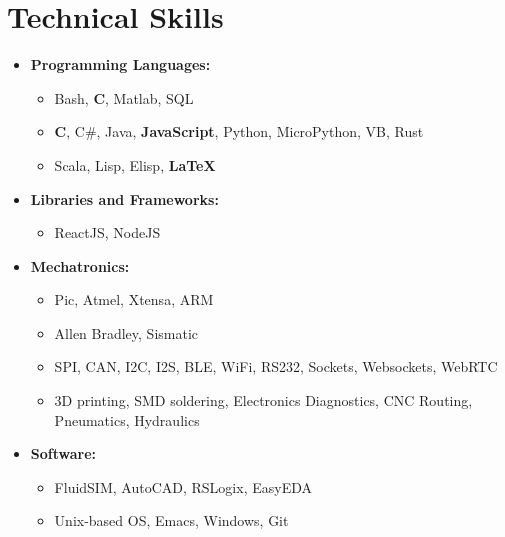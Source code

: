 \documentclass[10pt,letterpaper,sans]{moderncv}
\renewcommand{\_}{\textscale{.7}{\textunderscore}}
\newcommand{\Rplus}{\protect\hspace{-.1em}\protect\raisebox{.35ex}{\smaller{\smaller\textbf{+}}}}
\newcommand{\Cpp}{\mbox{C\Rplus\Rplus}\xspace}
\begin{document}
\section{Technical Skills}
\begin{itemize}
\item \textbf{Programming Languages:}
  \begin{itemize}
    \item {} Bash, \textbf{C}, Matlab, SQL
    \item {} \textbf{\Cpp}, C\#, Java, \textbf{JavaScript}, Python, MicroPython, VB, Rust
    \item {} Scala, Lisp, Elisp, \textbf{\LaTeX}
  \end{itemize}
\item \textbf{Libraries and Frameworks:} 
  \begin{itemize}
  \item {} ReactJS, NodeJS
  \end{itemize}
\item \textbf{Mechatronics:} 
  \begin{itemize}
  \item {} Pic, Atmel, Xtensa, ARM 
  \item {} Allen Bradley, Sismatic
  \item {} SPI, CAN, I2C, I2S, BLE, WiFi, RS232, Sockets, Websockets, WebRTC
  \item {} 3D printing, SMD soldering, Electronics Diagnostics, CNC Routing, Pneumatics, Hydraulics 
  \end{itemize}
\item \textbf{Software:} 
  \begin{itemize}
  \item {} FluidSIM, AutoCAD, RSLogix, EasyEDA 
  \item {} Unix-based OS, Emacs, Windows, Git
  \end{itemize}
\end{itemize}
\end{document}
